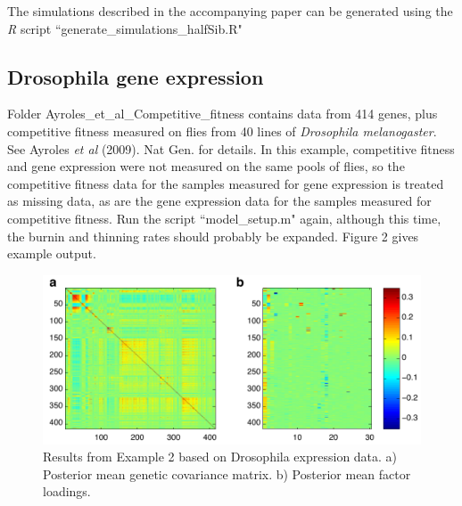 \documentclass[11pt]{amsart}
\begin{document}
The simulations described in the accompanying paper can be generated using the \emph{R} script ``generate\_simulations\_halfSib.R"

\subsection{Drosophila gene expression}
Folder Ayroles\_et\_al\_Competitive\_fitness contains data from 414 genes, plus competitive fitness measured on flies from 40 lines of \textit{Drosophila melanogaster}. See Ayroles \textit{et al} (2009). Nat Gen. for details. In this example, competitive fitness and gene expression were not measured on the same pools of flies, so the competitive fitness data for the samples measured for gene expression is treated as missing data, as are the gene expression data for the samples measured for competitive fitness. Run the script ``model\_setup.m" again, although this time, the burnin and thinning rates should probably be expanded. Figure 2 gives example output.

\begin{figure}[htbp]
\begin{center}
\includegraphics[width=6in]{Fly_Fig}
\caption{Results from Example 2 based on Drosophila expression data. a) Posterior mean genetic covariance matrix. b) Posterior mean factor loadings.}
\label{default}
\end{center}
\end{figure}
\end{document}

